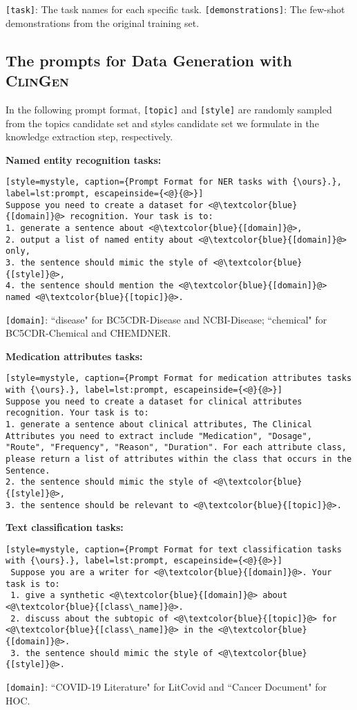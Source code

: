 \documentclass{article} %
\newcommand{\ours}{\textsc{ClinGen}\xspace}
\begin{document}
\texttt{[task]}: The task names for each specific task.
\texttt{[demonstrations]}: The few-shot demonstrations from the original training set.


\subsection{The prompts for Data Generation with {\ours}}
\label{sec:generation_prompt}
In the following prompt format, \texttt{[topic]} and \texttt{[style]} are randomly sampled from the topics candidate set and styles candidate set we formulate in the knowledge extraction step, respectively.

\textbf{Named entity recognition tasks:}

\begin{lstlisting}[style=mystyle, caption={Prompt Format for NER tasks with {\ours}.}, label=lst:prompt, escapeinside={<@}{@>}]
Suppose you need to create a dataset for <@\textcolor{blue}{[domain]}@> recognition. Your task is to:
1. generate a sentence about <@\textcolor{blue}{[domain]}@>,
2. output a list of named entity about <@\textcolor{blue}{[domain]}@> only,
3. the sentence should mimic the style of <@\textcolor{blue}{[style]}@>,
4. the sentence should mention the <@\textcolor{blue}{[domain]}@> named <@\textcolor{blue}{[topic]}@>.
\end{lstlisting}

\texttt{[domain]}: ``disease" for BC5CDR-Disease and NCBI-Disease; ``chemical" for BC5CDR-Chemical and CHEMDNER.

\textbf{Medication attributes tasks:}

\begin{lstlisting}[style=mystyle, caption={Prompt Format for medication attributes tasks with {\ours}.}, label=lst:prompt, escapeinside={<@}{@>}]
Suppose you need to create a dataset for clinical attributes recognition. Your task is to:
1. generate a sentence about clinical attributes, The Clinical Attributes you need to extract include "Medication", "Dosage", "Route", "Frequency", "Reason", "Duration". For each attribute class, please return a list of attributes within the class that occurs in the Sentence.
2. the sentence should mimic the style of <@\textcolor{blue}{[style]}@>,
3. the sentence should be relevant to <@\textcolor{blue}{[topic]}@>.
\end{lstlisting}


\textbf{Text classification tasks:}

\begin{lstlisting}[style=mystyle, caption={Prompt Format for text classification tasks with {\ours}.}, label=lst:prompt, escapeinside={<@}{@>}]
 Suppose you are a writer for <@\textcolor{blue}{[domain]}@>. Your task is to:
 1. give a synthetic <@\textcolor{blue}{[domain]}@> about <@\textcolor{blue}{[class\_name]}@>. 
 2. discuss about the subtopic of <@\textcolor{blue}{[topic]}@> for <@\textcolor{blue}{[class\_name]}@> in the <@\textcolor{blue}{[domain]}@>.
 3. the sentence should mimic the style of <@\textcolor{blue}{[style]}@>.
\end{lstlisting}
\texttt{[domain]}: ``COVID-19 Literature" for LitCovid and ``Cancer Document" for HOC.
\end{document}
